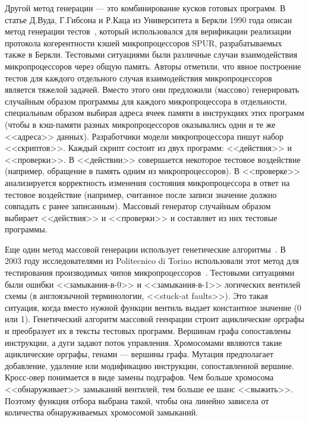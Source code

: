 Другой метод генерации --- это комбинирование кусков готовых программ. В статье Д.Вуда, Г.Гибсона и Р.Каца из Университета в Беркли 1990 года описан метод генерации тестов~\cite{Berkeley89}, который использовался для верификации реализации протокола когерентности кэшей микропроцессоров SPUR, разрабатываемых также в Беркли. Тестовыми ситуациями были различные случаи взаимодействия микропроцессоров через общую память. Авторы отметили, что явное построение тестов для каждого отдельного случая взаимодействия микропроцессоров является тяжелой задачей. Вместо этого они предложили (массово) генерировать случайным образом программы для каждого микропроцессора в отдельности, специальным образом выбирая адреса ячеек памяти в инструкциях этих программ (чтобы в кэш-памяти разных микропроцессоров оказывались одни и те же <<адреса>> данных). Разработчики модели микропроцессора пишут набор <<скриптов>>. Каждый скрипт состоит из двух программ: <<действия>> и <<проверки>>. В <<действии>> совершается некоторое тестовое воздействие (например, обращение в память одним из микропроцессоров). В <<проверке>> анализируется корректность изменения состояния микропроцессора в ответ на тестовое воздействие (например, считанное после записи значение должно совпадать с ранее записанным). Массовый генератор случайным образом выбирает <<действия>> и <<проверки>> и составляет из них тестовые программы.


Еще один метод массовой генерации использует генетические алгоритмы~\cite{GeneticAlgorithms}. В 2003 году исследователями из Politecnico di Torino использовали этот метод для тестирования производимых чипов микропроцессоров~\cite{microGP}. Тестовыми ситуациями были ошибки <<замыкания-в-0>> и <<замыкания-в-1>> логических вентилей схемы (в англоязычной терминологии, <<stuck-at faults>>). Это такая ситуация, когда вместо нужной функции вентиль выдает константное значение (0 или 1). Генетический алгоритм массовой геенрации строит ациклические орграфы и преобразует их в тексты тестовых программ. Вершинам графа сопоставлены инструкции, а дуги задают поток управления. Хромосомами являются такие ациклические орграфы, генами --- вершины графа. Мутация предполагает добавление, удаление или модификацию инструкции, сопоставленной вершине. Кросс-овер понимается в виде замены подграфов. Чем больше хромосома <<обнаруживает>> замыканий вентилей, тем больше ее шанс <<выжить>>. Поэтому функция отбора выбрана такой, чтобы она линейно зависела от количества обнаруживаемых хромосомой замыканий.

